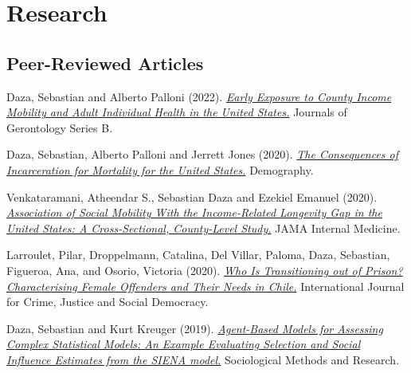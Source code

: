\documentclass[10pt,letterpaper]{article}
\renewenvironment{itemize}{
  \begin{list}{}{
    \setlength{\leftmargin}{1.5em}
    \setlength{\itemsep}{0.25em}
    \setlength{\parskip}{0pt}
    \setlength{\parsep}{0.25em}
  }
}{
  \end{list}
}
\begin{document}
\section*{Research}

\subsection*{Peer-Reviewed Articles}

\begin{itemize}

\item Daza, Sebastian and Alberto Palloni (2022).
  \textit{\href{https://academic.oup.com/psychsocgerontology/advance-article/doi/10.1093/geronb/gbab240/6519680?guestAccessKey=42f4029e-6430-4752-8f31-188b10a75141}{Early Exposure to County Income Mobility and Adult Individual Health in the United States.}
  }
  Journals of Gerontology Series B.

\item Daza, Sebastian, Alberto Palloni and Jerrett Jones (2020).
  \textit{\href{https://rdcu.be/b278V}
  {The Consequences of Incarceration for Mortality for the United States.}
  }
  Demography.

\item Venkataramani, Atheendar S., Sebastian Daza and Ezekiel Emanuel (2020).
  \textit{
  \href{https://jamanetwork.com/journals/jamainternalmedicine/fullarticle/2759132}
  {Association of Social Mobility With the Income-Related Longevity Gap in the United States: A Cross-Sectional, County-Level Study.}
  }
 JAMA Internal Medicine.


\item Larroulet, Pilar, Droppelmann, Catalina, Del Villar, Paloma, Daza, Sebastian, Figueroa, Ana, and Osorio, Victoria (2020).
    \textit{
  \href{https://www.crimejusticejournal.com/article/view/1467}
  {Who Is Transitioning out of Prison? Characterising Female Offenders and Their Needs in Chile.}
  }
International Journal for Crime, Justice and Social Democracy.

 \item Daza, Sebastian and Kurt Kreuger (2019).
  \textit{
  \href{https://doi.org/10.1177/0049124119826147}
  {Agent-Based Models for Assessing Complex Statistical Models: An Example Evaluating Selection and Social Influence Estimates from the SIENA model.}
  }
 Sociological Methods and Research.


\end{itemize}
\end{document}

